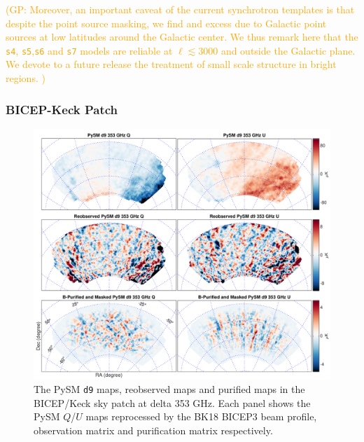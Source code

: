 \documentclass[twocolumn]{aastex631}
\newcommand{\giuse}[1]{\textcolor{orange}{(GP: #1)}}
\begin{document}
\giuse{Moreover, an important caveat of the current synchrotron templates is that despite the point source masking, we find and excess due to Galactic point sources at low   latitudes around the Galactic center. We thus remark here that the \texttt{s4}, \texttt{s5},\texttt{s6} and \texttt{s7} models  are reliable at $\ell \lesssim 3000 $ and outside the Galactic plane. We devote to a future release the treatment of small scale structure in bright regions. }


\subsubsection{BICEP-Keck Patch}

\begin{figure}
    \centering
    \includegraphics[width=2.\columnwidth]{figures/pysm_d9_353_delta_reobs_B_pub.pdf}
    \caption{The PySM \texttt{d9} maps, reobserved maps and purified maps in the BICEP/Keck sky patch at delta 353 GHz. Each panel shows the
    PySM $Q$/$U$ maps reprocessed by the BK18 BICEP3 beam profile, observation matrix and purification matrix respectively.}
    \label{fig:psym_BKmatrix}
\end{figure}
\end{document}
